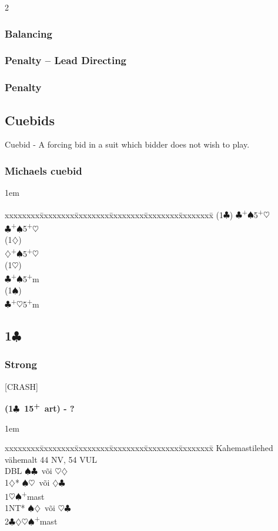 \documentclass[10pt]{article}
\renewcommand{\c}{$\clubsuit$}
\renewcommand{\d}{$\diamondsuit$}
\newcommand{\h}{$\heartsuit$}
\newcommand{\s}{$\spadesuit$}
\newcommand{\p}{\textsuperscript{+}}
\newcommand{\x}{DBL}
\newenvironment{bidtable}[1][]
{\textbf{#1}
  \begin{adjustwidth}{1em}{}
    \addvspace{2pt}
    \begin{tabbing}
      xxxxxxxx\=xxxxxxxx\=xxxxxxxx\=xxxxxxxx\=xxxxxxxx\=xxxxxxxx\=\kill}
{\end{tabbing}\end{adjustwidth}\bigskip}%
\newcommand{\pdfc}{\texorpdfstring{\c{}}{C}}
\begin{document}
\begin{multicols*}{2}
\subsubsection{Balancing}

\subsubsection{Penalty -- Lead Directing}

\subsubsection{Penalty}




\subsection{Cuebids}
Cuebid - A forcing bid in a suit which bidder does not wish to play.

\subsubsection{Michaels cuebid}

\begin{bidtable}
(1\c) \c {}\p\s 5\p\h                   \\
      \c {}\p\s 5\p\h \\
(1\d) \>                    \\
      \d {}\p\s 5\p\h \\
(1\h) \>                    \\
      \c {}\p\s 5\p m \\
(1\s) \>                    \\
      \c {}\p\h 5\p m \\
\end{bidtable}
\subsection{1\pdfc}

\subsubsection{Strong}

[CRASH]

\begin{bidtable}[(1\c\ 15\p\ art) - ?]
Kahemastilehed vähemalt 44 NV, 54 VUL \\
\x        \> \s\c\ või \h\d\          \\
1\d*      \> \s\h\ või \d\c           \\
1\h\s     {}\p mast                 \\
1NT*      \> \s\d\ või \h\c\          \\
2\c\d\h\s {}\p mast
\end{bidtable}


\end{multicols*}
\end{document}
